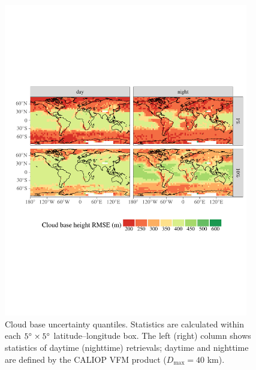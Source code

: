 \documentclass[essd,manuscript]{copernicus}\usepackage[]{graphicx}\usepackage[]{color}
\newenvironment{knitrout}{}{} %
\begin{document}
\begin{figure}
  \centering
\begin{knitrout}
\color{fgcolor}

{\centering \includegraphics[width=0.95\textwidth]{figure/method-cbase-uncert-quantiles-1} 

}



\end{knitrout}
  \caption{Cloud base uncertainty quantiles.  Statistics are calculated within
    each $5^{\circ}\times 5^{\circ}$ latitude--longitude box.  The left (right)
    column shows statistics of daytime (nighttime) retrievals; daytime and
    nighttime are defined by the CALIOP VFM product ($D_\text{max} = 40$ km).}
  \label{fig:uncert-quantiles}
\end{figure}
\end{document}
